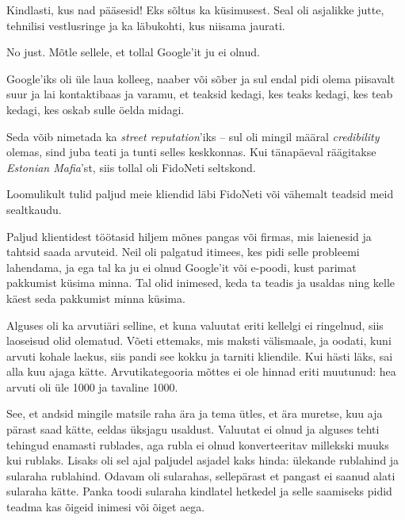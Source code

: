 
Kindlasti, kus nad pääsesid! Eks sõltus ka küsimusest. Seal oli asjalikke 
jutte, tehnilisi vestlusringe ja ka läbukohti, kus niisama jaurati.


No just. Mõtle sellele, et tollal Google'it ju ei olnud.

Google'iks oli üle laua kolleeg, naaber või sõber ja sul endal pidi olema 
piisavalt suur ja lai kontaktibaas ja varamu, et teaksid kedagi, kes 
teaks kedagi, kes teab kedagi, kes oskab sulle öelda midagi.


Seda võib nimetada ka \emph{street reputation}'iks -- sul oli mingil määral
\emph{credibility} olemas, sind juba teati ja tunti selles 
keskkonnas. Kui tänapäeval räägitakse \emph{Estonian Mafia}'st, siis tollal 
oli FidoNeti seltskond.

Loomulikult tulid paljud meie kliendid läbi FidoNeti või vähemalt teadsid 
meid sealtkaudu.

Paljud klientidest töötasid hiljem mõnes pangas või firmas, mis
laienesid ja tahtsid saada arvuteid. Neil oli palgatud itimees, 
kes pidi selle probleemi lahendama, ja ega tal ka ju ei olnud Google'it või 
e-poodi, kust parimat pakkumist küsima minna. Tal olid inimesed, keda 
ta teadis ja usaldas ning kelle käest seda pakkumist minna küsima.


Alguses oli ka arvutiäri selline, et kuna valuutat 
eriti kellelgi ei ringelnud, siis laoseisud olid olematud. 
Võeti ettemaks, mis maksti välismaale, ja oodati, 
kuni arvuti kohale laekus, siis pandi see kokku ja tarniti kliendile. Kui hästi 
läks, sai alla kuu ajaga kätte. Arvutikategooria mõttes ei ole
hinnad eriti muutunud: hea arvuti oli üle 1000 ja tavaline 1000.

See, et andsid mingile matsile raha ära ja tema ütles, et ära 
muretse, kuu aja pärast saad kätte, eeldas üksjagu usaldust. Valuutat 
ei olnud ja alguses tehti tehingud enamasti rublades, aga rubla ei olnud 
konverteeritav millekski muuks kui rublaks. Lisaks oli sel ajal paljudel 
asjadel kaks hinda: ülekande rublahind ja sularaha rublahind. Odavam oli 
sularahas, sellepärast et pangast ei saanud alati sularaha kätte. Panka toodi sularaha kindlatel hetkedel ja selle saamiseks pidid teadma kas 
õigeid inimesi või õiget aega.

